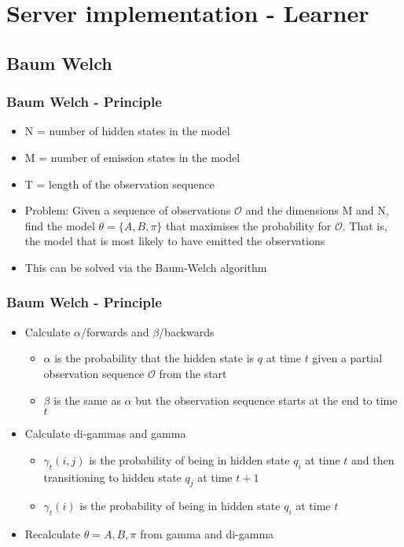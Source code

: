 \section{Server implementation - Learner}
\subsection{Baum Welch}
\begin{frame}
	\frametitle{Baum Welch - Principle}
	\begin{itemize}
		\item N = number of hidden states in the model
		\item M = number of emission states in the model
		\item T = length of the observation sequence
		\item Problem: Given a sequence of observations $\mathcal{O}$ and the dimensions M and N, find the model $\theta = \{A, B, \pi\}$ that maximises the probability for $\mathcal{O}$. That is, the model that is most likely to have emitted the observations
		\item This can be solved via the Baum-Welch algorithm
	\end{itemize}
\end{frame}

\begin{frame}
	\frametitle{Baum Welch - Principle}
	\begin{itemize}
		\item Calculate $\alpha$/forwards and $\beta$/backwards
		\begin{itemize}
			\item $\alpha$ is the probability that the hidden state is $q$ at time $t$ given a partial observation sequence $\mathcal{O}$ from the start
			\item $\beta$ is the same as $\alpha$ but the observation sequence starts at the end to time $t$
		\end{itemize}
		\item Calculate di-gammas and gamma
		\begin{itemize}
			\item $\gamma_t(i,j)$ is the probability of being in hidden state $q_i$ at time $t$ and then transitioning to hidden state $q_j$ at time $t+1$
			\item $\gamma_t(i)$ is the probability of being in hidden state $q_i$ at time $t$
		\end{itemize}
		\item Recalculate $\theta = {A,B,\pi}$ from gamma and di-gamma
	\end{itemize}
\end{frame}

